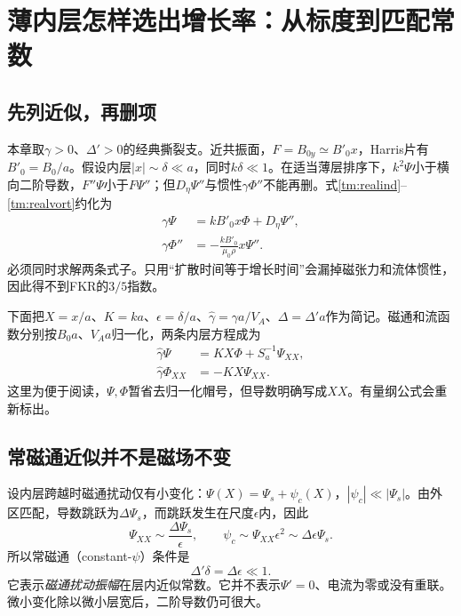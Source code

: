 \chapter{薄内层怎样选出增长率：从标度到匹配常数}\label{tm:matching}
\section{先列近似，再删项}
本章取$\gamma>0$、$\Delta'>0$的经典撕裂支。近共振面，$F=B_{0y}\simeq B'_0x$，Harris片有$B'_0=B_0/a$。假设内层$|x|\sim\delta\ll a$，同时$k\delta\ll1$。在适当薄层排序下，$k^2\Psi$小于横向二阶导数，$F''\Psi$小于$F\Psi''$；但$D_\eta\Psi''$与惯性$\gamma\Phi''$不能再删。式\eqref{tm:realind}--\eqref{tm:realvort}约化为
\begin{align}
 \gamma\Psi&=kB'_0x\Phi+D_\eta\Psi'',\label{tm:inner1}\\
 \gamma\Phi''&=-\frac{kB'_0}{\mu_0\rho}x\Psi''.
 \label{tm:inner2}
\end{align}
必须同时求解两条式子。只用“扩散时间等于增长时间”会漏掉磁张力和流体惯性，因此得不到FKR的$3/5$指数。

下面把$X=x/a$、$K=ka$、$\epsilon=\delta/a$、$\hat\gamma=\gamma a/V_A$、$\Delta=\Delta'a$作为简记。磁通和流函数分别按$B_0a$、$V_Aa$归一化，两条内层方程成为
\begin{align}
 \hat\gamma\Psi&=KX\Phi+S_a^{-1}\Psi_{XX},\label{tm:innernorm1}\\
 \hat\gamma\Phi_{XX}&=-KX\Psi_{XX}.
 \label{tm:innernorm2}
\end{align}
这里为便于阅读，$\Psi,\Phi$暂省去归一化帽号，但导数明确写成$XX$。有量纲公式会重新标出。

\section{常磁通近似并不是磁场不变}
设内层跨越时磁通扰动仅有小变化：$\Psi(X)=\Psi_s+\psi_c(X)$，$|\psi_c|\ll|\Psi_s|$。由外区匹配，导数跳跃为$\Delta\Psi_s$，而跳跃发生在尺度$\epsilon$内，因此
\begin{equation}
 \Psi_{XX}\sim\frac{\Delta\Psi_s}{\epsilon},\qquad
 \psi_c\sim\Psi_{XX}\epsilon^2\sim\Delta\epsilon\Psi_s.
 \label{tm:constpsiscaling}
\end{equation}
所以常磁通（constant-$\psi$）条件是
\begin{equation}
 \boxed{\Delta'\delta=\Delta\epsilon\ll1.}
 \label{tm:constpsicond}
\end{equation}
它表示\emph{磁通扰动振幅}在层内近似常数。它并不表示$\Psi'=0$、电流为零或没有重联。微小变化除以微小层宽后，二阶导数仍可很大。

